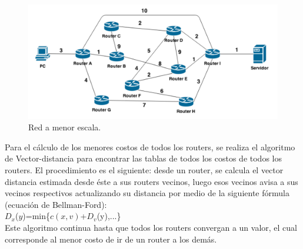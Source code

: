 \documentclass{article}
\begin{document}
\begin{figure}[ht!]
\centering
\includegraphics[width=130mm]{red1.PNG}
\caption{Red a menor escala.}
\label{overflow}
\end{figure}

Para el c\'alculo de los menores costos de todos los routers, se realiza el algoritmo de Vector-distancia para encontrar las tablas de todos los costos de todos los routers. El procedimiento es el siguiente: desde un router, se calcula el vector distancia estimada desde \'este a sus routers vecinos, luego esos vecinos avisa a sus vecinos respectivos actualizando su distancia por medio de la siguiente f\'ormula (ecuaci\'on de Bellman-Ford):\\

$D_x$($y$)=min\{$c(x,v)$+$D_v$(y),...\}
\\

Este algoritmo continua hasta que todos los routers convergan a un valor, el cual corresponde al menor costo de ir de un router a los dem\'as.\\
\end{document}
